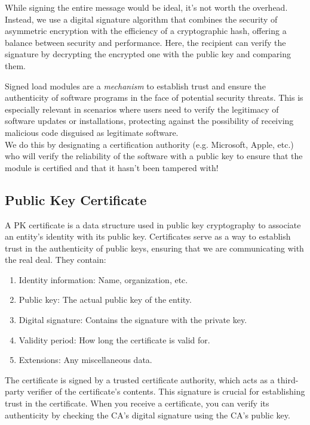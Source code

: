\documentclass{report}
\newcommand{\corollaryBegin}[1]{\begin{tcolorbox}[colback=teal!5!white,colframe=black!75!teal,title={Corollary:
      #1}]}
\newcommand{\corollaryEnd}{\end{tcolorbox}}
\begin{document}
While signing the entire message would be ideal, it's not worth the overhead. Instead, we use a
digital signature algorithm that combines the security of asymmetric encryption with the efficiency
of a cryptographic hash, offering a balance between security and performance. Here, the recipient
can verify the signature by decrypting the encrypted one with the public key and comparing them.


\corollaryBegin{Signed Load Modules}
Signed load modules are a \textit{mechanism} to establish trust and ensure the authenticity of
software programs in the face of potential security threats. This is especially relevant in
scenarios where users need to verify the legitimacy of software updates or installations, protecting
against the possibility of receiving malicious code disguised as legitimate software. \\

We do this by designating a certification authority (e.g. Microsoft, Apple, etc.) who will verify
the reliability of the software with a public key to ensure that the module is certified and that it
hasn't been tampered with!
\corollaryEnd


\subsection{Public Key Certificate}
A PK certificate is a data structure used in public key cryptography to associate an entity's
identity with its public key. Certificates serve as a way to establish trust in the authenticity of
public keys, ensuring that we are communicating with the real deal. They contain:

\begin{enumerate}[label=\textit{(\roman*)}]
\item Identity information: Name, organization, etc.
\item Public key: The actual public key of the entity.
\item Digital signature: Contains the signature with the private key.
\item Validity period: How long the certificate is valid for.
\item Extensions: Any miscellaneous data.
\end{enumerate}

The certificate is signed by a trusted certificate authority, which acts as a third-party verifier
of the certificate's contents. This signature is crucial for establishing trust in the
certificate. When you receive a certificate, you can verify its authenticity by checking the CA's
digital signature using the CA's public key. 
\end{document}
